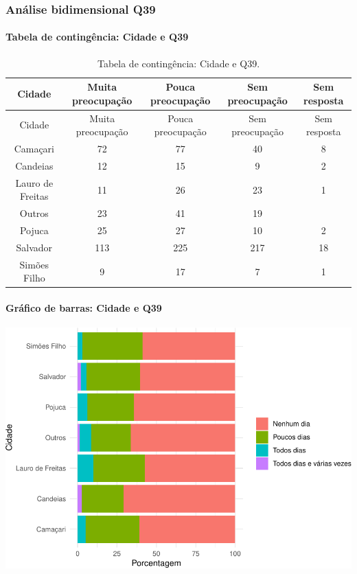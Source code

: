 \documentclass[]{article}
\let\oldparagraph\paragraph
\renewcommand{\paragraph}[1]{\oldparagraph{#1}\mbox{}}
\begin{document}
\cleardoublepage

\hypertarget{anuxe1lise-bidimensional-q39}{%
\subsubsection{Análise bidimensional Q39}\label{anuxe1lise-bidimensional-q39}}

\hypertarget{tabela-de-continguxeancia-cidade-e-q39}{%
\paragraph{Tabela de contingência: Cidade e Q39}\label{tabela-de-continguxeancia-cidade-e-q39}}

\begin{longtable}[]{@{}ccccc@{}}
\caption{\label{tab:unnamed-chunk-1488}Tabela de contingência: Cidade e Q39.}\tabularnewline
\toprule
Cidade & Muita preocupação & Pouca preocupação & Sem preocupação & Sem resposta\tabularnewline
\midrule
\endfirsthead
\toprule
Cidade & Muita preocupação & Pouca preocupação & Sem preocupação & Sem resposta\tabularnewline
\midrule
\endhead
Camaçari & 72 & 77 & 40 & 8\tabularnewline
Candeias & 12 & 15 & 9 & 2\tabularnewline
Lauro de Freitas & 11 & 26 & 23 & 1\tabularnewline
Outros & 23 & 41 & 19 &\tabularnewline
Pojuca & 25 & 27 & 10 & 2\tabularnewline
Salvador & 113 & 225 & 217 & 18\tabularnewline
Simões Filho & 9 & 17 & 7 & 1\tabularnewline
\bottomrule
\end{longtable}

\hypertarget{gruxe1fico-de-barras-cidade-e-q39}{%
\paragraph{Gráfico de barras: Cidade e Q39}\label{gruxe1fico-de-barras-cidade-e-q39}}

\begin{center}\includegraphics[width=0.75\linewidth]{relatorio_covid19_files/figure-latex/unnamed-chunk-1489-1} \end{center}
\end{document}
